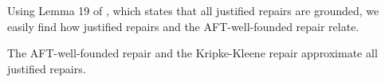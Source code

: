 Using Lemma 19 of \citet{iclp/Cruz-Filipe16}, which states that all justified repairs are grounded, we easily find how justified repairs and the AFT-well-founded repair relate. 




\begin{corollary}
 The AFT-well-founded repair and the Kripke-Kleene repair approximate all justified repairs. 
\end{corollary}

